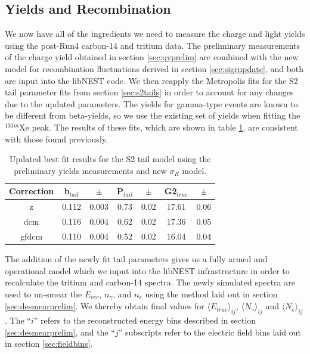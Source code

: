 \subsection{Yields and Recombination}
We now have all of the ingredients we need to measure the charge and light yields using the post-Run4 carbon-14 and tritium data. The preliminary measurements of the charge yield obtained in section \ref{sec:qyprelim} are combined with the new model for recombination fluctuations derived in section \ref{sec:sigrupdate}, and both are input into the libNEST code. We then reapply the Metropolis fits for the S2 tail parameter fits from section \ref{sec:s2tails} in order to account for any changes due to the updated parameters. The yields for gamma-type events are known to be different from beta-yields, so we use the existing set of yields when fitting the $^{131m}$Xe peak. The results of these fits, which are shown in table \ref{tab:s2bestfit_new}, are consistent with those found previously.
\begin{table}[h!]
\centering
    \begin{tabular}{ c | c | c | c | c | c | c }
    \hline
    Correction & b$_{tail}$ & $\pm$ & P$_{tail}$ & $\pm$  & G2$_{true}$ & $\pm$ \\
    \hline \hline
    z & 0.112 & 0.003 & 0.73 & 0.02 & 17.61 & 0.06\\
    \hline
    dcm & 0.116 & 0.004 & 0.62 & 0.02 & 17.36 & 0.05 \\
    \hline
    gfdcm & 0.110 & 0.004 & 0.52 & 0.02 & 16.04 & 0.04 \\
    \hline
    \end{tabular}
    \caption{Updated best fit results for the S2 tail model using the preliminary yields measurements and new $\sigma_R$ model.}
    \label{tab:s2bestfit_new}
\end{table}

The addition of the newly fit tail parameters gives us a fully armed and operational model which we input into the libNEST infrastructure in order to recalculate the tritium and carbon-14 spectra. The newly simulated spectra are used to un-smear the $E_{rec}$, $n_{\gamma}$, and $n_e$ using the method laid out in section \ref{sec:desmearprelim}. We thereby obtain final values for $\langle E_{true} \rangle_{ij}$, $\langle N_{\gamma} \rangle_{ij}$ and $\langle N_{e} \rangle_{ij}$. The ``$i$'' refers to the reconstructed energy bins described in section  \ref{sec:desmearprelim}, and the ``$j$'' subscripts refer to the electric field bins laid out in section \ref{sec:fieldbins}.

